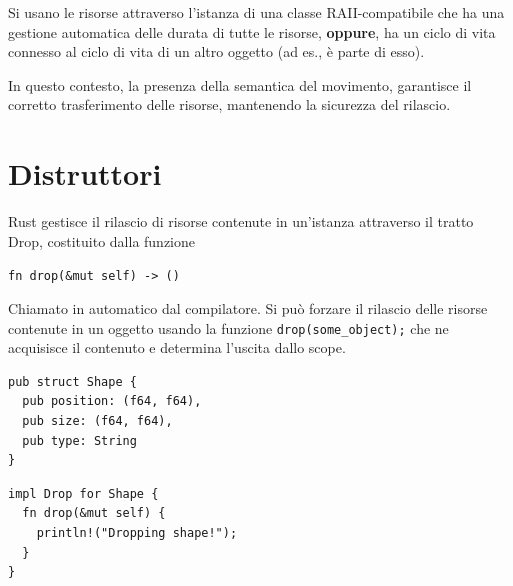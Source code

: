 Si usano le risorse attraverso l'istanza di una classe RAII-compatibile che ha una gestione
automatica delle durata di tutte le risorse, \textbf{oppure}, ha un ciclo di vita connesso
al ciclo di vita di un altro oggetto (ad es., è parte di esso).


In questo contesto, la presenza della semantica del movimento, garantisce il
corretto trasferimento delle risorse, mantenendo la sicurezza del rilascio.


\section{Distruttori}

Rust gestisce il rilascio di risorse contenute in un'istanza attraverso il tratto Drop,
costituito dalla funzione

\begin{center}
  \centering
  \texttt{fn drop(&mut self) -> ()}
\end{center}

Chiamato in automatico dal compilatore.
Si può forzare il rilascio delle risorse contenute in un oggetto usando la funzione
\texttt{drop(some_object);} che ne acquisisce il contenuto e determina l'uscita dallo scope.

\begin{center}
  \centering
  \begin{minipage}{\linewidth}
    \begin{minipage}{0.47\linewidth}

      \begin{verbatim}
pub struct Shape {
  pub position: (f64, f64),
  pub size: (f64, f64),
  pub type: String
}

\end{verbatim}

    \end{minipage}%
    \hfill
    \begin{minipage}{\linewidth}
      \begin{minipage}{0.47\linewidth}

        \begin{verbatim}
impl Drop for Shape {
  fn drop(&mut self) {
    println!("Dropping shape!");
  }
}
\end{verbatim}
      \end{minipage}
    \end{minipage}
  \end{minipage}
\end{center}



